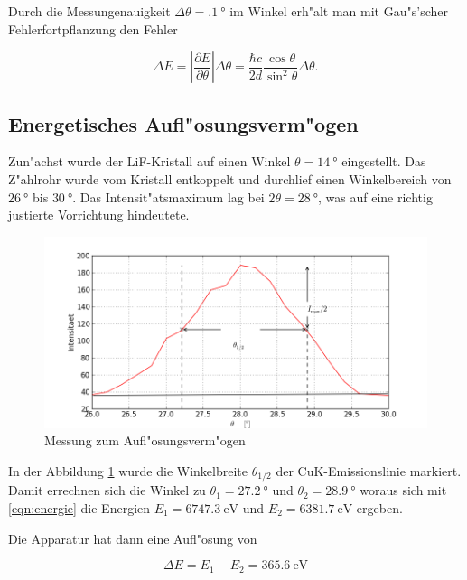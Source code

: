 	Durch die Messungenauigkeit $\Delta \theta = \SI{.1}{\degree}$ im Winkel erh"alt man mit Gau"s'scher Feh\-ler\-fort\-pflanz\-ung den Fehler

	\begin{equation}
		\Delta E = \left| \frac{\partial E}{\partial \theta} \right| \Delta \theta = 
		\frac{\hbar c}{2 d} \frac{\cos{\theta}}{\sin^2{\theta}} \Delta \theta . \nonumber
	\end{equation}

	\subsection{Energetisches Aufl"osungsverm"ogen}
		\label{subsec:aufloesung}

		Zun"achst wurde der LiF-Kristall auf einen Winkel $\theta = \SI{14}{\degree}$ eingestellt.
		Das Z"ahlrohr wurde vom Kristall entkoppelt und durchlief einen Winkelbereich von $\SI{26}{\degree}$ bis $\SI{30}{\degree}$.
		Das Intensit"atsmaximum lag bei $2\theta = \SI{28}{\degree}$, was auf eine richtig justierte Vorrichtung hin\-deu\-te\-te.

		\begin{figure}[h!]
			\centering
			\includegraphics[width = 15cm]{img/graph_adjust.png}
			\caption{Messung zum Aufl"osungsverm"ogen}
			\label{fig:aufloesung}
		\end{figure}

		In der Abbildung \ref{fig:aufloesung} wurde die Winkelbreite $\theta_{1/2}$ der CuK-Emissionslinie markiert.
		Damit errechnen sich die Winkel zu $\theta_1 = \SI{27.2}{\degree}$ und $\theta_2 = \SI{28.9}{\degree}$ woraus sich mit \eqref{eqn:energie} die Energien $E_1 = \SI{6747.3}{\electronvolt}$ und $E_2 = \SI{6381.7}{\electronvolt}$ ergeben.

		Die Apparatur hat dann eine Aufl"osung von

		\begin{equation}
			\Delta E = E_1 - E_2 = \SI{365.6}{\electronvolt} \nonumber
		\end{equation}

